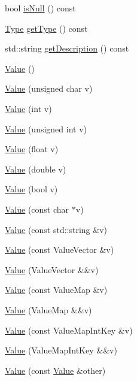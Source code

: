 \begin{DoxyCompactItemize}
\item 
bool \hyperlink{classValue_a920e68dea455df1b5857cd93790ff98a}{is\+Null} () const
\item 
\hyperlink{classValue_a669e0b7bc64c01dbec39297930398541}{Type} \hyperlink{classValue_a47f2fcdd9f53f9066190f2034078cc10}{get\+Type} () const
\item 
std\+::string \hyperlink{classValue_af1c0374c880e1543ff000bc6103c4441}{get\+Description} () const
\item 
\hyperlink{classValue_abc2a5a2e6484fac66dae2539cc955667}{Value} ()
\item 
\hyperlink{classValue_aabe730986b0548c9de3e52ea086e6b8c}{Value} (unsigned char v)
\item 
\hyperlink{classValue_ad66a1aec17bd011f542d70e8dcf85739}{Value} (int v)
\item 
\hyperlink{classValue_aca420574da40e0503bbb5b3c124a19b4}{Value} (unsigned int v)
\item 
\hyperlink{classValue_a522f9e03113fc05bab847df24c68c648}{Value} (float v)
\item 
\hyperlink{classValue_ac23a80a895f9777f1c7f61f62483d632}{Value} (double v)
\item 
\hyperlink{classValue_acbcf978c0d65b9b506277cc11bc49c8e}{Value} (bool v)
\item 
\hyperlink{classValue_a7db8cffa4a718b7d80ddd6a9a7ce39db}{Value} (const char $\ast$v)
\item 
\hyperlink{classValue_a2eba631d78407365a6c900aac4a59fc1}{Value} (const std\+::string \&v)
\item 
\hyperlink{classValue_a4502e594309480551ac7a2b883783fbb}{Value} (const Value\+Vector \&v)
\item 
\hyperlink{classValue_ae0da25f68aae6575f644cb16fb87eab8}{Value} (Value\+Vector \&\&v)
\item 
\hyperlink{classValue_a7d97b1a3f68d81c2eda9ca546ff6ce82}{Value} (const Value\+Map \&v)
\item 
\hyperlink{classValue_a8b38ee46eed8e2ea0426999b932f4cd3}{Value} (Value\+Map \&\&v)
\item 
\hyperlink{classValue_a28899b86170bb33fce537aeeed94d582}{Value} (const Value\+Map\+Int\+Key \&v)
\item 
\hyperlink{classValue_acbc7dacfe7f92f9272c055e681e0ee61}{Value} (Value\+Map\+Int\+Key \&\&v)
\item 
\hyperlink{classValue_acc427785c9007f762772d1dbe7535295}{Value} (const \hyperlink{classValue}{Value} \&other)
\item 

\end{DoxyCompactItemize}
